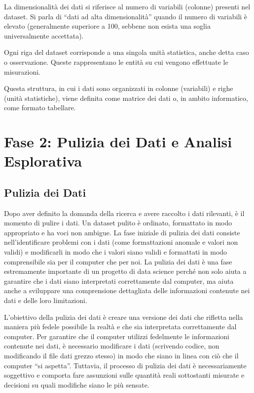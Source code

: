 \documentclass[
  letterpaper,
  DIV=11,
  numbers=noendperiod]{scrreprt}
\theoremstyle{definition}
\theoremstyle{remark}
\begin{document}
La dimensionalità dei dati si riferisce al numero di variabili (colonne)
presenti nel dataset. Si parla di ``dati ad alta dimensionalità'' quando
il numero di variabili è elevato (generalmente superiore a 100, sebbene
non esista una soglia universalmente accettata).

Ogni riga del dataset corrisponde a una singola unità statistica, anche
detta caso o osservazione. Queste rappresentano le entità su cui vengono
effettuate le misurazioni.

Questa struttura, in cui i dati sono organizzati in colonne (variabili)
e righe (unità statistiche), viene definita come matrice dei dati o, in
ambito informatico, come formato tabellare.

\section{Fase 2: Pulizia dei Dati e Analisi
Esplorativa}\label{fase-2-pulizia-dei-dati-e-analisi-esplorativa}

\subsection{Pulizia dei Dati}\label{pulizia-dei-dati}

Dopo aver definito la domanda della ricerca e avere raccolto i dati
rilevanti, è il momento di pulire i dati. Un dataset pulito è ordinato,
formattato in modo appropriato e ha voci non ambigue. La fase iniziale
di pulizia dei dati consiste nell'identificare problemi con i dati (come
formattazioni anomale e valori non validi) e modificarli in modo che i
valori siano validi e formattati in modo comprensibile sia per il
computer che per noi. La pulizia dei dati è una fase estremamente
importante di un progetto di data science perché non solo aiuta a
garantire che i dati siano interpretati correttamente dal computer, ma
aiuta anche a sviluppare una comprensione dettagliata delle informazioni
contenute nei dati e delle loro limitazioni.

L'obiettivo della pulizia dei dati è creare una versione dei dati che
rifletta nella maniera più fedele possibile la realtà e che sia
interpretata correttamente dal computer. Per garantire che il computer
utilizzi fedelmente le informazioni contenute nei dati, è necessario
modificare i dati (scrivendo codice, non modificando il file dati grezzo
stesso) in modo che siano in linea con ciò che il computer ``si
aspetta''. Tuttavia, il processo di pulizia dei dati è necessariamente
soggettivo e comporta fare assunzioni sulle quantità reali sottostanti
misurate e decisioni su quali modifiche siano le più sensate.
\end{document}
